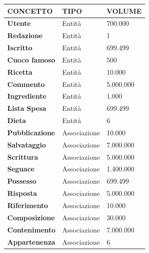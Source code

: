 \documentclass[12pt]{extarticle}
\begin{document}
\vspace{1cm}
    \begin{tabularx}{\textwidth}{X|X|X}
    \bfseries CONCETTO     & \bfseries TIPO  & \bfseries VOLUME \\ 
    \hline\hline
    \bfseries Utente        & Entità        & 700.000       \\ 
    \hline
    \bfseries Redazione     & Entità        & 1             \\
    \hline
    \bfseries Iscritto      & Entità        & 699.499       \\
    \hline
    \bfseries Cuoco famoso  & Entità        & 500           \\
    \hline
    \bfseries Ricetta       & Entità        & 10.000        \\
    \hline
    \bfseries Commento      & Entità        & 5.000.000     \\
    \hline
    \bfseries Ingrediente   & Entità        & 1.000         \\
    \hline
    \bfseries Lista Spesa   & Entità        & 699.499       \\
    \hline
    \bfseries Dieta         & Entità        & 6             \\
    \hline
    \bfseries Pubblicazione & Associazione  & 10.000        \\
    \hline
    \bfseries Salvataggio   & Associazione  & 7.000.000     \\
    \hline
    \bfseries Scrittura     & Associazione  & 5.000.000     \\
    \hline
    \bfseries Seguace       & Associazione  & 1.400.000     \\
    \hline
    \bfseries Possesso      & Associazione  & 699.499       \\
    \hline
    \bfseries Risposta      & Associazione  & 5.000.000     \\
    \hline
    \bfseries Riferimento   & Associazione  & 10.000        \\
    \hline
    \bfseries Composizione  & Associazione  & 30.000        \\
    \hline
    \bfseries Contenimento  & Associazione  & 7.000.000     \\
    \hline
    \bfseries Appartenenza  & Associazione  & 6             \\
    \hline
    \end{tabularx}
\vspace{1cm}
\end{document}
